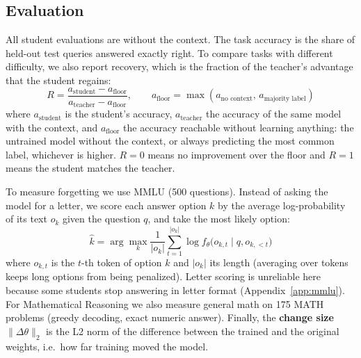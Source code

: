 \documentclass{article} %
\begin{document}
\subsection{Evaluation}
All student evaluations are without the context. The task accuracy is the share of held-out test
queries answered exactly right. To compare tasks with different difficulty, we also report
recovery, which is the fraction of the teacher's advantage that the student regains:
\begin{equation}
  R = \frac{a_{\text{student}} - a_{\text{floor}}}{a_{\text{teacher}} - a_{\text{floor}}},
  \qquad a_{\text{floor}} = \max(a_{\text{no context}},\, a_{\text{majority label}})
  \label{eq:recovery}
\end{equation}
where $a_{\text{student}}$ is the student's accuracy, $a_{\text{teacher}}$ the accuracy of the same
model with the context, and $a_{\text{floor}}$ the accuracy reachable without learning anything: the
untrained model without the context, or always predicting the most common label, whichever is higher.
$R=0$ means no improvement over the floor and $R=1$ means the student matches the teacher.

To measure forgetting we use MMLU \citep{hendrycks2021mmlu} (500 questions). Instead of asking the model
for a letter, we score each answer option $k$ by the average log-probability of its text $o_k$ given
the question $q$, and take the most likely option:
\begin{equation}
  \hat{k} = \arg\max_{k} \frac{1}{|o_k|}\sum_{t=1}^{|o_k|} \log f_\theta\big(o_{k,t} \mid q, o_{k,<t}\big)
  \label{eq:mmlu}
\end{equation}
where $o_{k,t}$ is the $t$-th token of option $k$ and $|o_k|$ its length (averaging over tokens keeps
long options from being penalized). Letter scoring is unreliable here because some students stop answering
in letter format (Appendix~\ref{app:mmlu}). For Mathematical Reasoning we also measure general math on
175 MATH problems \citep{hendrycks2021math} (greedy decoding, exact numeric answer). Finally, the
\textbf{change size} $\|\Delta\theta\|_2$ is the L2 norm of the difference between the trained and the
original weights, i.e.\ how far training moved the model.
\end{document}
